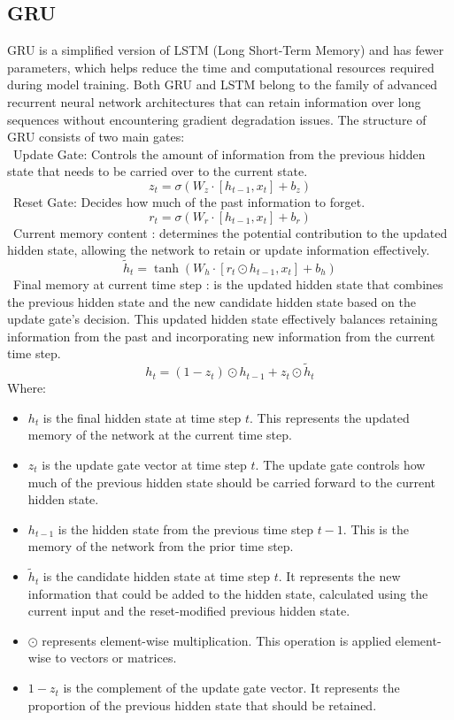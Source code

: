 \documentclass{ieeeojies}
\begin{document}
\subsection{GRU}
GRU is a simplified version of LSTM (Long Short-Term Memory) and has fewer parameters, which helps reduce the time and computational resources required during model training. Both GRU and LSTM belong to the family of advanced recurrent neural network architectures that can retain information over long sequences without encountering gradient degradation issues.
The structure of GRU consists of two main gates:
\\
\indent\textbullet\ Update Gate: Controls the amount of information from the previous hidden state that needs to be carried over to the current state.
\[
z_t = \sigma(W_z \cdot [h_{t-1}, x_t] + b_z)
\]
\indent\textbullet\ Reset Gate: Decides how much of the past information to forget. \\
\[
r_t = \sigma(W_r \cdot [h_{t-1}, x_t] + b_r)
\]
\indent\textbullet\ Current memory content : determines the potential contribution to the updated hidden state, allowing the network to retain or update information effectively.\\
\[
\tilde{h}_t = \tanh(W_h \cdot [r_t \odot h_{t-1}, x_t] + b_h)
\]
\indent\textbullet\ Final memory at current time step : is the updated hidden state that combines the previous hidden state and the new candidate hidden state based on the update gate's decision. This updated hidden state effectively balances retaining information from the past and incorporating new information from the current time step.\\
\[
h_t = (1 - z_t) \odot h_{t-1} + z_t \odot \tilde{h}_t
\]
Where:
\begin{itemize}
  \item \( h_t \) is the final hidden state at time step \( t \). This represents the updated memory of the network at the current time step.
  \item \( z_t \) is the update gate vector at time step \( t \). The update gate controls how much of the previous hidden state should be carried forward to the current hidden state.
  \item \( h_{t-1} \) is the hidden state from the previous time step \( t-1 \). This is the memory of the network from the prior time step.
  \item \( \tilde{h}_t \) is the candidate hidden state at time step \( t \). It represents the new information that could be added to the hidden state, calculated using the current input and the reset-modified previous hidden state.
  \item \( \odot \) represents element-wise multiplication. This operation is applied element-wise to vectors or matrices.
  \item \( 1 - z_t \) is the complement of the update gate vector. It represents the proportion of the previous hidden state that should be retained.
\end{itemize}
\end{document}
